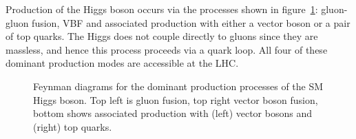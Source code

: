 Production of the Higgs boson occurs via the processes shown in
figure~\ref{fig:SMFeynmanDiagrams}: gluon-gluon fusion, \ac{VBF} and associated
production with either a vector boson or a pair of top quarks. The Higgs does
not couple directly to gluons since they are massless, and hence this process
proceeds via a quark loop. All four of these dominant production modes are
accessible at the LHC. 

\begin{figure}[htbp]

\caption{Feynman diagrams for the dominant production processes of the SM Higgs
boson. Top left is gluon fusion, top right vector boson fusion, bottom shows
associated production with (left) vector bosons and (right) top quarks.}
\label{fig:SMFeynmanDiagrams}
\end{figure}

